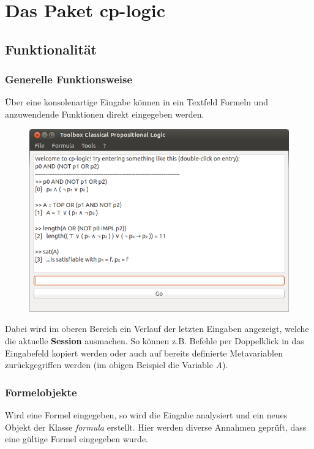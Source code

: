 \documentclass[11pt,a4paper,ngerman]{scrreprt}
\begin{document}
\chapter{Das Paket cp-logic} %
\section{Funktionalität}
\subsection{Generelle Funktionsweise}
Über eine konsolenartige Eingabe können in ein Textfeld Formeln und anzuwendende Funktionen direkt eingegeben werden.

\begin{figure}[ht]
\centering
\includegraphics[width=.9\linewidth]{pics/gui.png}
\end{figure}

Dabei wird im oberen Bereich ein Verlauf der letzten Eingaben angezeigt, welche die aktuelle \textbf{Session} ausmachen. So können z.B. Befehle per Doppelklick in das Eingabefeld kopiert werden oder auch auf bereits definierte Metavariablen zurückgegriffen werden (im obigen Beispiel die Variable \textit{A}). %

\subsection{Formelobjekte}
Wird eine Formel eingegeben, so wird die Eingabe analysiert und ein neues Objekt der Klasse \textit{formula} erstellt. Hier werden diverse Annahmen geprüft, dass eine gültige Formel eingegeben wurde.
\end{document}
